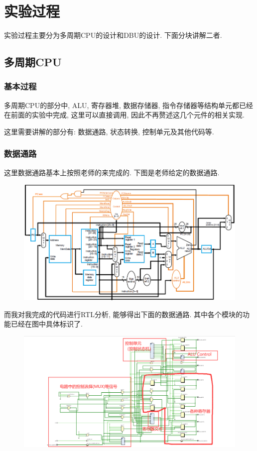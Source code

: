 \documentclass[UTF8]{article}
\begin{document}
\section{实验过程}
实验过程主要分为多周期CPU的设计和DBU的设计. 下面分块讲解二者.
\subsection{多周期CPU}
\subsubsection{基本过程}
多周期CPU的部分中, ALU, 寄存器堆, 数据存储器, 指令存储器等结构单元都已经在前面的实验中完成, 这里可以直接调用, 因此不再赘述这几个元件的相关实现.\par
这里需要讲解的部分有: 数据通路, 状态转换, 控制单元及其他代码等.\par
\subsubsection{数据通路}
这里数据通路基本上按照老师的来完成的. 下图是老师给定的数据通路.\par
\begin{figure}[H]
	\centering
	\includegraphics[width=\linewidth]{cpu_data_path_standard.png}
\end{figure}
而我对我完成的代码进行RTL分析, 能够得出下面的数据通路. 其中各个模块的功能已经在图中具体标识了.\par
\begin{figure}[H]
	\centering
	\includegraphics[width=\linewidth]{cpu_data_path.png}
\end{figure}
\end{document}
